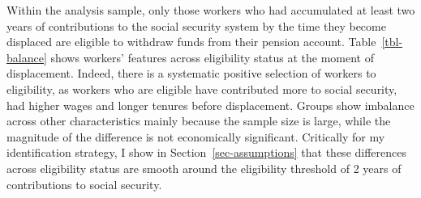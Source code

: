 \documentclass[
  4pt,
]{report}
\begin{document}
Within the analysis sample, only those workers who had accumulated at
least two years of contributions to the social security system by the
time they become displaced are eligible to withdraw funds from their
pension account. Table~\ref{tbl-balance} shows workers' features across
eligibility status at the moment of displacement. Indeed, there is a
systematic positive selection of workers to eligibility, as workers who
are eligible have contributed more to social security, had higher wages
and longer tenures before displacement. Groups show imbalance across
other characteristics mainly because the sample size is large, while the
magnitude of the difference is not economically significant. Critically
for my identification strategy, I show in Section~\ref{sec-assumptions}
that these differences across eligibility status are smooth around the
eligibility threshold of 2 years of contributions to social security.
\end{document}
